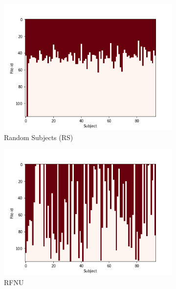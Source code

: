 \documentclass[10pt, conference, compsocconf]{IEEEtran}
\begin{document}
\begin{figure}[h!]
        \begin{subfigure}[b]{0.45\columnwidth}
                 \includegraphics[width=\columnwidth]{figures/5vs7_RS_04_training}
                \caption{Random Subjects (RS)}
                  \label{fig:Uniform-S-Sample-Training-set}
        \end{subfigure}
        \begin{subfigure}[b]{0.45\columnwidth}
                  \includegraphics[width=\columnwidth]{figures/5vs7_RFNU_04_training}
                  \caption{RFNU}
                  \label{fig:Diagonal-Sample-Training-set}
        \end{subfigure}
        \begin{subfigure}[b]{0.45\columnwidth}

\end{subfigure}
\end{figure}
\end{document}

